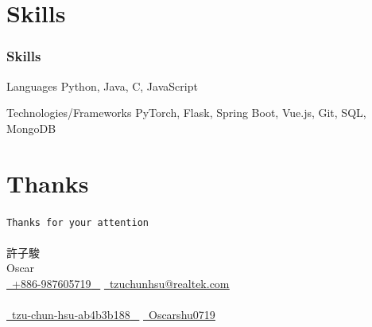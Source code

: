 \documentclass{beamer}
\begin{document}
\section{Skills}
\begin{frame}
    \frametitle{Skills}
    \begin{block}{Languages}
        Python, Java, C, JavaScript
    \end{block}
    \begin{block}{Technologies/Frameworks}
        PyTorch, Flask, Spring Boot, Vue.js, Git, SQL, MongoDB
    \end{block}
\end{frame}

\section{Thanks}
\begin{frame}
    \begin{center}
        \huge{\texttt{Thanks for your attention}} \\~\\
        \LARGE{許子駿} \\ \Large{Oscar} \\
        \vspace{16pt}
        \scriptsize{
            \href{tel:+886-987605719}{ \raisebox{-0.1\height}\faPhone\ \underline{+886-987605719} ~} 
            \href{mailto:vm3y3rmp40719@gmail.com}{\raisebox{-0.2\height}\faEnvelope\  \underline{tzuchunhsu@realtek.com}} \\~\\
            \href{https://www.linkedin.com/in/tzu-chun-hsu-ab4b3b188/}{\raisebox{-0.2\height}\faLinkedinSquare\ \underline{tzu-chun-hsu-ab4b3b188} ~}
            \href{https://github.com/Oscarshu0719}{\raisebox{-0.2\height}\faGithub\ \underline{Oscarshu0719}}
        }
    \end{center}
\end{frame}
\end{document}
